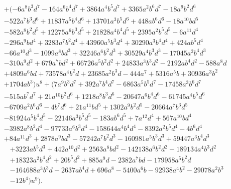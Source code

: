 \documentclass{gtpart}
\theoremstyle{definition}
\theoremstyle{remark}
\begin{document}
\begin{equation*}
\begin{split}
      & + (-6 a^8 b^3 d^7 - 164 a^6 b^4 d^7 + 3864 a^4 b^5 d^7 + 3365 a^2 b^6 d^7 - 18 a^9 b^2 d^6 \\
      & - 522 a^7 b^3 d^6 + 11837 a^5 b^4 d^6 + 13701 a^3 b^5 d^6 + 448 a b^6 d^6 - 18 a^{10} b d^5 \\
      & - 582 a^8 b^2 d^5 + 12275 a^6 b^3 d^5 + 21828 a^4 b^4 d^5 + 2395 a^2 b^5 d^5 - 6 a^{11} d^4 \\
      & - 296 a^9 b d^4 + 3283 a^7 b^2 d^4 + 43960 a^5 b^3 d^4 + 30290 a^3 b^4 d^4 + 424 a b^5 d^4 \\
      & - 66 a^{10} d^3 - 1099 a^8 b d^3 + 32246 a^6 b^2 d^3 + 30529 a^4 b^3 d^3 - 17045 a^2 b^4 d^3 \\
      & - 310 a^9 d^2 + 679 a^7 b d^2 + 66726 a^5 b^2 d^2 + 24833 a^3 b^3 d^2 - 2192 a b^4 d^2 - 588 a^8 d \\
      & + 4809 a^6 b d + 73578 a^4 b^2 d + 23685 a^2 b^3 d - 444 a^7 + 5316 a^5 b + 30936 a^3 b^2 \\
      & + 1704 a b^3) u^8 + (7 a^9 b^3 d^7 + 392 a^7 b^4 d^7 - 6863 a^5 b^5 d^7 - 17458 a^3 b^6 d^7 \\
      & - 515 a b^7 d^7 + 21 a^{10} b^2 d^6 + 1218 a^8 b^3 d^6 - 20647 a^6 b^4 d^6 - 61745 a^4 b^5 d^6 \\
      & - 6709 a^2 b^6 d^6 - 4 b^7 d^6 + 21 a^{11} b d^5 + 1302 a^9 b^2 d^5 - 20664 a^7 b^3 d^5 \\
      & - 81924 a^5 b^4 d^5 - 22146 a^3 b^5 d^5 - 183 a b^6 d^5 + 7 a^{12} d^4 + 567 a^{10} b d^4 \\
      & - 3982 a^8 b^2 d^4 - 97733 a^6 b^3 d^4 - 158644 a^4 b^4 d^4 - 8392 a^2 b^5 d^4 - 4 b^6 d^4 \\
      & + 84 a^{11} d^3 + 2878 a^9 b d^3 - 57242 a^7 b^2 d^3 - 160981 a^5 b^3 d^3 + 59447 a^3 b^4 d^3 
\end{split}
\end{equation*}
\begin{equation*}
\begin{split}
~~    & + 3223 a b^5 d^3 + 442 a^{10} d^2 + 2563 a^8 b d^2 - 142138 a^6 b^2 d^2 - 189134 a^4 b^3 d^2 \\
      & + 18323 a^2 b^4 d^2 + 20 b^5 d^2 + 885 a^9 d - 2382 a^7 b d - 179958 a^5 b^2 d \\
      & - 164688 a^3 b^3 d - 2637 a b^4 d + 696 a^8 - 5400 a^6 b - 92938 a^4 b^2 - 29078 a^2 b^3 \\
      & - 12 b^4) u^9 \big).  
\end{split}
\end{equation*}
\end{document}
